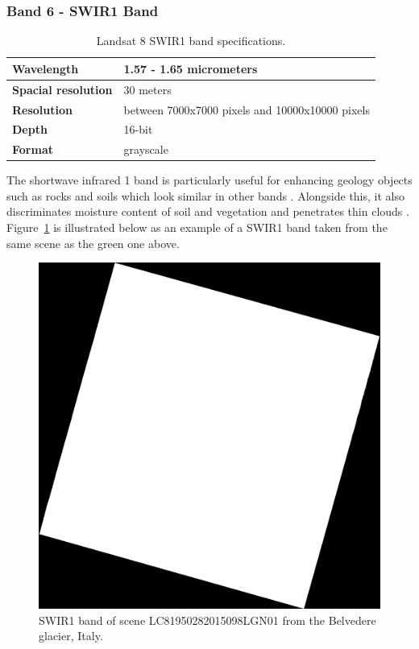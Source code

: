 \documentclass[11pt, a4paper]{report}
\begin{document}
	\subsubsection{Band 6 - SWIR1 Band}
	
	\begin{table} [h]
		\center
		\begin{tabular} {| l | l |}
			\hline
			\textbf{Wavelength} & {1.57 - 1.65 micrometers} \\ [0.2ex]
			\hline
			\textbf{Spacial resolution} & {30 meters} \\ [0.2ex]
			\hline
			\textbf{Resolution} & {between 7000x7000 pixels and 10000x10000 pixels} \\ [0.2ex]
			\hline
			\textbf{Depth} & {16-bit}\\ [0.2ex]
			\hline
			\textbf{Format} & {grayscale}\\ [0.2ex]
			\hline
		\end{tabular}
		\caption{Landsat 8 SWIR1 band specifications.}
		\label{table:swir1_table}
	\end{table}
	The shortwave infrared 1 band is particularly useful for enhancing geology objects such as rocks and soils which look similar in other bands \cite{bd}. Alongside this, it also discriminates moisture content of soil and vegetation and penetrates thin clouds \cite{bands}. Figure~\ref{fig:belvedere_swir1} is illustrated below as an example of a SWIR1 band taken from the same scene as the green one above.
	\begin{figure}[h]
		\centering
		\includegraphics[scale=0.3]{../images/LC81950282015098LGN01_B6.png}
		\caption{SWIR1 band of scene LC81950282015098LGN01 from the Belvedere glacier, Italy.}
		\label{fig:belvedere_swir1}
	\end{figure}
	
\end{document}
